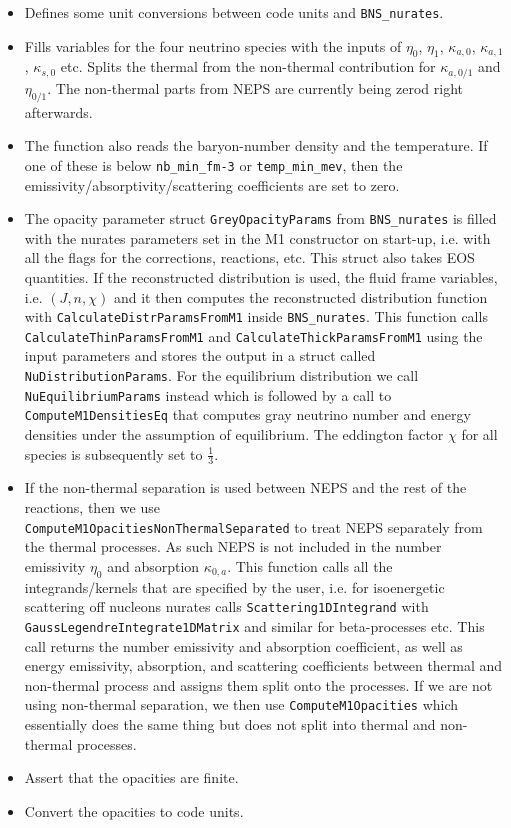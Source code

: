 \documentclass{article}
\newcommand{\var}[1]{%
  {\setlength{\fboxsep}{1.5pt}%
   \colorbox{varbg}{\textcolor{varfg}{\texttt{\small #1}}}}}
\begin{document}
\begin{itemize}
  \item Defines some unit conversions between code units and \texttt{BNS\_nurates}.
  \item Fills variables for the four neutrino species with the inputs of $\eta_0$, $\eta_1$, $\kappa_{a,0}$, $\kappa_{a,1}$, $\kappa_{s,0}$ etc. Splits the
  thermal from the non-thermal contribution for $\kappa_{a,0/1}$ and $\eta_{0/1}$. The non-thermal parts from NEPS are currently being zerod right afterwards.
  \item The function also reads the baryon-number density and the temperature. If one of these is below \var{nb\_min\_fm-3} or \var{temp\_min\_mev}, then the emissivity/absorptivity/scattering coefficients
  are set to zero.
  \item The opacity parameter struct \var{GreyOpacityParams} from \texttt{BNS\_nurates} is filled with the nurates parameters set in the M1 constructor on start-up, i.e.
  with all the flags for the corrections, reactions, etc. This struct also takes EOS quantities. If the reconstructed distribution is used, the fluid frame variables, i.e.
  $(J,n,\chi)$ and it then computes the reconstructed distribution function with \var{CalculateDistrParamsFromM1} inside \texttt{BNS\_nurates}. This function calls
  \var{CalculateThinParamsFromM1} and \var{CalculateThickParamsFromM1} using the input parameters and stores the output in a struct called \var{NuDistributionParams}.
  For the equilibrium distribution we call \var{NuEquilibriumParams} instead which is followed by a call to \var{ComputeM1DensitiesEq} that computes
  gray neutrino number and energy densities under the assumption of equilibrium. The eddington factor $\chi$ for all species is subsequently set to $\frac{1}{3}$.
  \item If the non-thermal separation is used between NEPS and the rest of the reactions, then we use \\
  \var{ComputeM1OpacitiesNonThermalSeparated} to treat NEPS separately
  from the thermal processes. As such NEPS is not included in the number emissivity $\eta_0$ and absorption $\kappa_{0,a}$. This function calls all the integrands/kernels that are specified
  by the user, i.e. for isoenergetic scattering off nucleons nurates calls \var{Scattering1DIntegrand} with \var{GaussLegendreIntegrate1DMatrix} and similar for beta-processes etc. This call returns
  the number emissivity and absorption coefficient, as well as energy emissivity, absorption, and scattering coefficients between thermal and non-thermal process and assigns them split
  onto the processes. If we are not using non-thermal separation, we then use \var{ComputeM1Opacities} which essentially does the same thing but does not split into
  thermal and non-thermal processes.
  \item Assert that the opacities are finite.
  \item Convert the opacities to code units.
\end{itemize}
\end{document}
